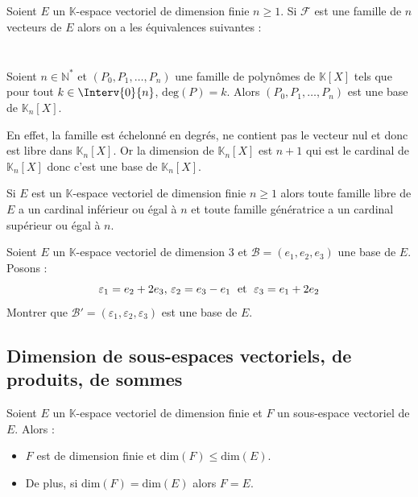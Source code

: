 \documentclass[a4paper,10pt]{report}
\begin{document}
 \begin{Proposition}{}
 Soient $E$ un $\mathbb{K}$-espace vectoriel de dimension finie $n \geq 1$. Si $\mathcal{F}$ est une famille de $n$ vecteurs de $E$ alors on a les équivalences suivantes : 
$$ \phantom{\mathcal{F} \hbox{ est une base de E} \Longleftrightarrow \mathcal{F} \hbox{ est libre } \Longleftrightarrow \mathcal{F} \hbox{ est génératrice de E }}$$
\end{Proposition}

\begin{Exemple} Soient $n \in \mathbb{N}^*$ et $(P_0,P_1, \ldots, P_n)$ une famille de polynômes de $\mathbb{K}[X]$ tels que pour tout $k \in \Interv{0}{n}$, $\textrm{deg}(P) = k$. Alors $(P_0,P_1, \ldots, P_n)$ est une base de $\mathbb{K}_n[X]$.

En effet, la famille est échelonné en degrés, ne contient pas le vecteur nul et donc est libre dans $\mathbb{K}_n[X]$. Or la dimension de $\mathbb{K}_n[X]$ est $n+1$ qui est le cardinal de $\mathbb{K}_n[X]$ donc c'est une base de $\mathbb{K}_n[X]$.
\end{Exemple}

\medskip

\begin{Remarque}{} Si $E$ est un $\mathbb{K}$-espace vectoriel de dimension finie $n \geq 1$ alors toute famille libre de $E$ a un cardinal inférieur ou égal à $n$ et toute famille génératrice a un cardinal supérieur ou égal à $n$.
\end{Remarque}

\begin{ApplicationDirecte} Soient $E$ un $\mathbb{K}$-espace vectoriel de dimension 3 et $\mathcal{B} = (e_{1} ,e_{2} ,e_{3})$ une base de $E$. Posons :
  \[
  \varepsilon_{1} = e_{2} + 2e_{3} , \, \varepsilon_{2} = e_{3} - e_{1} \; \hbox{ et } \; \varepsilon_{3} = e_{1} + 2e_{2}
  \]
Montrer que $\mathcal{B}' = (\varepsilon_{1} ,\varepsilon_{2} ,\varepsilon_{3})$ est une base de $E$.
\end{ApplicationDirecte}

\subsection{Dimension de sous-espaces vectoriels, de produits, de sommes}

\begin{Proposition}{}  Soient $E$ un $\mathbb{K}$-espace vectoriel de dimension finie et $F$ un sous-espace vectoriel de $E$. Alors :

\begin{itemize}
\item $F$ est de dimension finie et $\textrm{dim}(F) \leq \textrm{dim}(E)$.
\item De plus, si $\textrm{dim}(F) = \textrm{dim}(E)$ alors $F=E$.
\end{itemize}
\end{Proposition}
\end{document}
